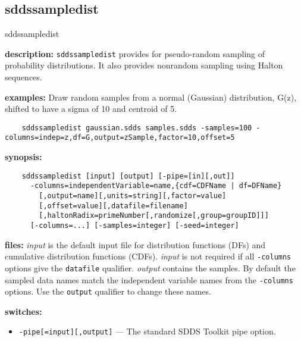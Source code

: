 \newpage
\subsection{sddssampledist}
\label{sddssampledist}

\begin{sddsprog}{sddssampledist}
  \item \textbf{description:} \verb|sddssampledist| provides for pseudo-random sampling of probability distributions. It also provides nonrandom sampling using Halton sequences.
  \item \textbf{examples:} Draw random samples from a normal (Gaussian) distribution, G(z), shifted to have a sigma of 10 and centroid of 5.
    \begin{verbatim}
    sddssampledist gaussian.sdds samples.sdds -samples=100 -columns=indep=z,df=G,output=zSample,factor=10,offset=5
    \end{verbatim}
  \item \textbf{synopsis:}
    \begin{verbatim}
    sddssampledist [input] [output] [-pipe=[in][,out]]
      -columns=independentVariable=name,{cdf=CDFName | df=DFName}
        [,output=name][,units=string][,factor=value]
        [,offset=value][,datafile=filename]
        [,haltonRadix=primeNumber[,randomize[,group=groupID]]]
      [-columns=...] [-samples=integer] [-seed=integer]
    \end{verbatim}
  \item \textbf{files:}
    \emph{input} is the default input file for distribution functions (DFs) and cumulative distribution functions (CDFs). \emph{input} is not required if all \verb|-columns| options give the \verb|datafile| qualifier.
    \emph{output} contains the samples. By default the sampled data names match the independent variable names from the \verb|-columns| options. Use the \verb|output| qualifier to change these names.
  \item \textbf{switches:}
    \begin{itemize}
      \item \verb|-pipe[=input][,output]| --- The standard SDDS Toolkit pipe option.

\end{itemize}
\end{sddsprog}
